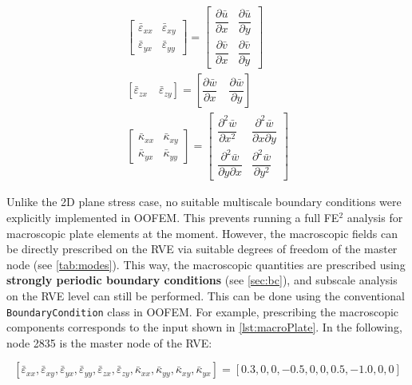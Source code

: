 \documentclass[11pt]{article}
\begin{document}
\begin{eqnarray}
    \begin{bmatrix}
        \bar{\varepsilon}_{xx} & \bar{\varepsilon}_{xy}\\
        \bar{\varepsilon}_{yx} & \bar{\varepsilon}_{yy} 
    \end{bmatrix}  =
    \begin{bmatrix}
        \dfrac{\partial \bar{u}}{\partial x} & \dfrac{\partial \bar{u}}{\partial y} \\
        \dfrac{\partial \bar{v}}{\partial x}  & \dfrac{\partial \bar{v}}{\partial y}  
       \end{bmatrix}  \\
    \left[ \bar{\varepsilon}_{zx} \quad \bar{\varepsilon}_{zy} \right] = \left[ \dfrac{\partial \bar{w}}{\partial x} \quad  \dfrac{\partial \bar{w}}{\partial y} \right]\\
    \begin{bmatrix}
        \bar{\kappa}_{xx} & \bar{\kappa}_{xy}\\
        \bar{\kappa}_{yx} & \bar{\kappa}_{yy} 
    \end{bmatrix}  =
    \begin{bmatrix}
        \dfrac{\partial^2 \bar{w}}{\partial x^2} & \dfrac{\partial^2 \bar{w}}{\partial x \partial y} \\
        \dfrac{\partial^2 \bar{w}}{\partial y \partial x}  & \dfrac{\partial^2 \bar{w}}{\partial y^2}  
       \end{bmatrix}
\end{eqnarray}

\noindent Unlike the 2D plane stress case, no suitable multiscale boundary conditions were explicitly implemented in OOFEM. This prevents running a full FE$^2$ analysis for macroscopic plate elements at the moment. 
However, the macroscopic fields can be directly prescribed on the RVE via suitable degrees of freedom of the master node (see \cref{tab:modes}). 
This way, the macroscopic quantities are prescribed using \textbf{strongly periodic boundary conditions} (see \cref{sec:bc}), and subscale analysis on the RVE level can still be performed. 
This can be done using the conventional \texttt{BoundaryCondition} class in OOFEM. For example, prescribing the macroscopic components corresponds to the input shown in \cref{lst:macroPlate}. In the following, node 2835 is the master node of the RVE:

\begin{equation*}
    \left[ \bar{\varepsilon}_{xx}, \bar{\varepsilon}_{xy}, \bar{\varepsilon}_{yx}, \bar{\varepsilon}_{yy}, \bar{\varepsilon}_{zx}, \bar{\varepsilon}_{zy}, \bar{\kappa}_{xx}, \bar{\kappa}_{yy}, \bar{\kappa}_{xy}, \bar{\kappa}_{yx} \right] = \left[ 0.3, 0 , 0 , -0.5 , 0 , 0 , 0.5 , -1.0 , 0 , 0 \right]
\end{equation*}
\end{document}
